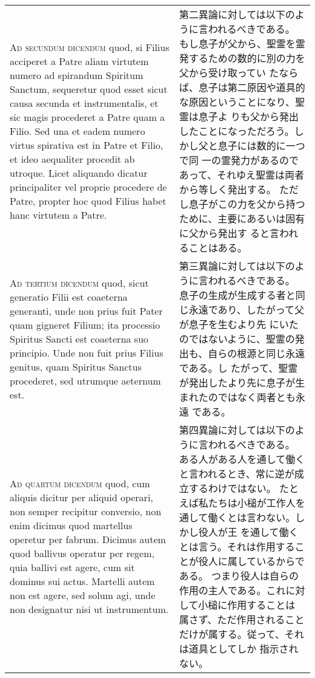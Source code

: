 \documentclass[10pt]{jsarticle} %
\begin{document}
\begin{longtable}{p{21em}p{21em}}
\\



{\scshape Ad secundum dicendum} quod, si Filius acciperet a Patre aliam virtutem
numero ad spirandum  Spiritum Sanctum, sequeretur quod esset sicut
causa secunda et instrumentalis, et sic magis procederet a Patre quam
a Filio. Sed una et eadem numero virtus spirativa est in Patre et
Filio, et ideo aequaliter procedit ab utroque. Licet aliquando dicatur
principaliter vel proprie procedere de Patre, propter hoc quod Filius
habet hanc virtutem a Patre.

&

第二異論に対しては以下のように言われるべきである。
もし息子が父から、聖霊を霊発するための数的に別の力を父から受け取ってい
たならば、息子は第二原因や道具的な原因ということになり、聖霊は息子よ
りも父から発出したことになっただろう。しかし父と息子には数的に一つで同
 一の霊発力があるのであって、それゆえ聖霊は両者から等しく発出する。
ただし息子がこの力を父から持つために、主要にあるいは固有に父から発出す
 ると言われることはある。


\\



{\scshape Ad tertium dicendum} quod, sicut generatio Filii est coaeterna
generanti, unde non prius fuit Pater quam gigneret Filium; ita
processio  Spiritus Sancti est coaeterna suo principio. Unde non fuit
prius Filius genitus, quam Spiritus Sanctus procederet,
sed utrumque aeternum est.

&

第三異論に対しては以下のように言われるべきである。
息子の生成が生成する者と同じ永遠であり、したがって父が息子を生むより先
 にいたのではないように、聖霊の発出も、自らの根源と同じ永遠である。し
 たがって、聖霊が発出したより先に息子が生まれたのではなく両者とも永遠
 である。

\\



{\scshape Ad quartum dicendum} quod, cum aliquis dicitur per aliquid operari, non
semper recipitur conversio, non enim dicimus quod martellus operetur
per fabrum. Dicimus autem quod ballivus operatur per regem, quia
ballivi est agere, cum sit dominus sui actus. Martelli autem non est
agere, sed solum agi, unde non designatur nisi ut
instrumentum. 

&

第四異論に対しては以下のように言われるべきである。
ある人がある人を通して働くと言われるとき、常に逆が成立するわけではない。
 たとえば私たちは小槌が工作人を通して働くとは言わない。しかし役人が王
 を通して働くとは言う。それは作用することが役人に属しているからである。
 つまり役人は自らの作用の主人である。これに対して小槌に作用することは
 属さず、ただ作用されることだけが属する。従って、それは道具としてしか
 指示されない。


\end{longtable}
\end{document}
